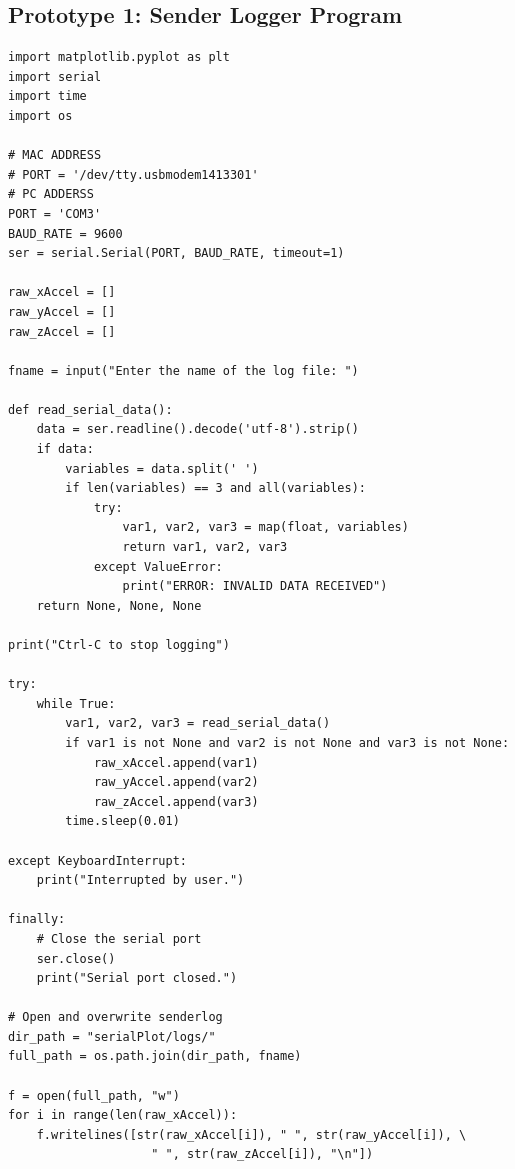 \subsection{Prototype 1: Sender Logger Program}
\begin{verbatim}
import matplotlib.pyplot as plt
import serial
import time
import os

# MAC ADDRESS
# PORT = '/dev/tty.usbmodem1413301'
# PC ADDERSS
PORT = 'COM3'
BAUD_RATE = 9600
ser = serial.Serial(PORT, BAUD_RATE, timeout=1)

raw_xAccel = []
raw_yAccel = []
raw_zAccel = [] 

fname = input("Enter the name of the log file: ")

def read_serial_data():
    data = ser.readline().decode('utf-8').strip()
    if data:
        variables = data.split(' ')
        if len(variables) == 3 and all(variables):
            try:
                var1, var2, var3 = map(float, variables)
                return var1, var2, var3
            except ValueError:
                print("ERROR: INVALID DATA RECEIVED")
    return None, None, None

print("Ctrl-C to stop logging")

try:
    while True:
        var1, var2, var3 = read_serial_data()
        if var1 is not None and var2 is not None and var3 is not None:
            raw_xAccel.append(var1) 
            raw_yAccel.append(var2)
            raw_zAccel.append(var3)
        time.sleep(0.01)

except KeyboardInterrupt:
    print("Interrupted by user.")

finally:
    # Close the serial port
    ser.close()
    print("Serial port closed.")

# Open and overwrite senderlog
dir_path = "serialPlot/logs/"
full_path = os.path.join(dir_path, fname)

f = open(full_path, "w")
for i in range(len(raw_xAccel)):
    f.writelines([str(raw_xAccel[i]), " ", str(raw_yAccel[i]), \
                    " ", str(raw_zAccel[i]), "\n"])
\end{verbatim}
